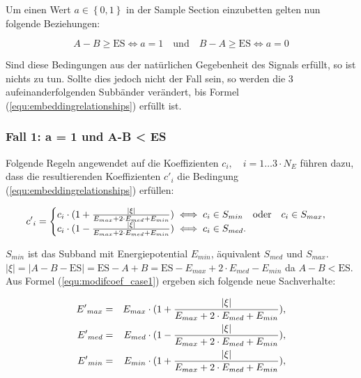 Um einen Wert $a \in\left\{0,1\right\}$ in der Sample Section einzubetten gelten nun folgende Beziehungen:

	 \begin{equation}
		 A - B \geq \mbox{ES} \iff a = 1 \quad\mbox{und}\quad B - A \geq \mbox{ES} \iff a = 0 \label{equ:embeddingrelationships}
	 \end{equation}
	 
Sind diese Bedingungen aus der natürlichen Gegebenheit des Signals erfüllt, so ist nichts zu tun. Sollte dies jedoch nicht der Fall sein, so werden die 3 aufeinanderfolgenden Subbänder verändert, bis Formel (\ref{equ:embeddingrelationships}) erfüllt ist. 

\subsubsection{Fall 1: a = 1 und A-B < ES} 

Folgende Regeln angewendet auf die Koeffizienten ${c}_{i},\quad i=1\dots{3\cdot{N}_{E}}$ führen dazu, dass die resultierenden Koeffizienten ${c'}_{i}$ die Bedingung (\ref{equ:embeddingrelationships}) erfüllen:

	 \begin{equation}
		 {c'}_{i} = \begin{cases}
    	 				{c}_{i} \cdot ( 1 + { |\xi| \over {{E}_{max} + 2\cdot {E}_{med} + {E}_{min}} }) \iff {c}_{i} \in {S}_{min} \quad\mbox{oder}\quad {c}_{i} \in {S}_{max}, 
						\\
    					{c}_{i} \cdot ( 1 - { |\xi| \over {{E}_{max} + 2\cdot {E}_{med} + {E}_{min}} }) \iff {c}_{i} \in {S}_{med}.
  				  	\end{cases}
		  \label{equ:modifcoef_case1}
	 \end{equation}
	 
${S}_{min}$ ist das Subband mit Energiepotential ${E}_{min}$, äquivalent ${S}_{med}$ und ${S}_{max}$. $|\xi| = |A-B-\mbox{ES}| = \mbox{ES}-A+B = \mbox{ES} - {E}_{max} + 2\cdot {E}_{med} - {E}_{min}$ da $A-B<\mbox{ES}$. Aus Formel (\ref{equ:modifcoef_case1}) ergeben sich folgende neue Sachverhalte:
	 
	 \begin{eqnarray*}
		 {E'}_{max} & = & {E}_{max} \cdot (1 + { |\xi| \over {{E}_{max} + 2\cdot {E}_{med} + {E}_{min}} }),
		 \\ 
		 {E'}_{med} & = & {E}_{med} \cdot (1 - { |\xi| \over {{E}_{max} + 2\cdot {E}_{med} + {E}_{min}} }),
		 \\
		 {E'}_{min} & = & {E}_{min} \cdot (1 + { |\xi| \over {{E}_{max} + 2\cdot {E}_{med} + {E}_{min}} }),
	\end{eqnarray*}	 
	 
